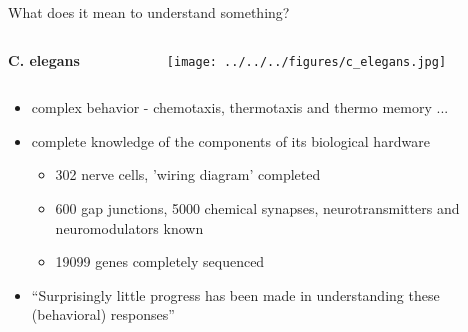 \documentclass[]{beamer}
\begin{document}
\begin{frame}{What does it mean to understand something?}

\begin{overlayarea}{110mm}{75mm}
\begin{columns}[T]
\begin{column}{40mm}
\vspace{6mm}
\begin{center}  
\textbf{C. elegans} 
\end{center}
\end{column}
\begin{column}{60mm}
  \begin{center}  
\texttt{[image: ../../../figures/c\_elegans.jpg]}
  \end{center}
\end{column} 
\end{columns}


\begin{itemize}
 \item<2-> complex behavior - chemotaxis, thermotaxis and thermo memory ...
 \item<3-> complete knowledge of the components of its biological hardware 
\begin{itemize}
 \item<3-> 302 nerve cells, 'wiring diagram' completed
 \item<3->  600 gap junctions, 5000 chemical synapses, neurotransmitters and neuromodulators known 
 \item<3->  19099 genes completely sequenced
\end{itemize}
\item<4> ``Surprisingly little progress has been made in understanding these (behavioral) responses''
\end{itemize}
\end{overlayarea}
\begin{center}
\end{center}
\end{frame}
\end{document}
